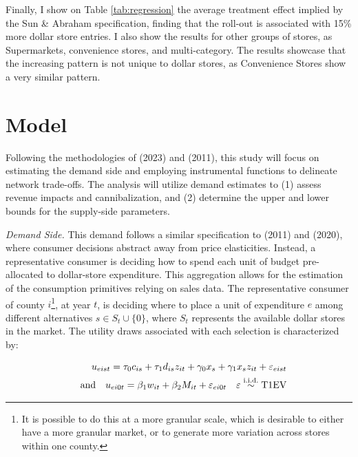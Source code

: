 \documentclass[11.5pt]{article}
\begin{document}
Finally, I show on Table \ref{tab:regression} the average treatment effect implied by the Sun \& Abraham specification, finding that the roll-out is associated with 15\% more dollar store entries. I also show the results for other groups of stores, as Supermarkets, convenience stores, and multi-category. The results showcase that the increasing pattern is not unique to dollar stores, as Convenience Stores show a very similar pattern.




\section{Model}


Following the methodologies of \citeauthor{houde2023nexus} (2023) and \citeauthor{holmes2011diffusion} (2011), this study will focus on estimating the demand side and employing instrumental functions to delineate network trade-offs. The analysis will utilize demand estimates to (1) assess revenue impacts and cannibalization, and (2) determine the upper and lower bounds for the supply-side parameters.


\textit{Demand Side.} %
This demand follows a similar specification to \citeauthor{holmes2011diffusion} (2011) and \citeauthor{ellickson2020measuring} (2020), where consumer decisions abstract away from price elasticities. Instead, a representative consumer is deciding how to spend each unit of budget 
pre-allocated to dollar-store expenditure. This aggregation allows for the estimation of the consumption primitives relying on sales data. The representative consumer of county $i$\footnote{It is possible to do this at a more granular scale, which is desirable to either have a more granular market, or to generate more variation across stores within one county.}, at year $t$, is deciding where to place a unit of expenditure $e$ among different alternatives  $s \in S_{t}\cup \{0\}$, where $S_t$ represents the available dollar stores in the market. The utility draws associated with each selection is characterized by:

\begin{align}
    u_{eist} =\tau_0 c_{is} + \tau_1 d_{is} z_{it} + \gamma_0 x_s + \gamma_1 x_s  z_{it} + \varepsilon_{eist} \notag\\  \quad \text{and} \quad  u_{ei0t} =  \beta_1w_{it}  + \beta_2 M_{it} + \varepsilon_{ei0t} \quad \varepsilon \overset{\text{i.i.d.}}{\sim} \text{T1EV}
\end{align}
\end{document}
